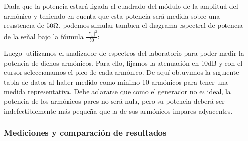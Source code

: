 \documentclass[../../labo_tp5_main.tex]{subfiles}
\begin{document}

Dada que la potencia estará ligada al cuadrado del módulo de la amplitud del armónico y teniendo en cuenta que esta potencia será medida sobre una resistencia de $50\ohm$, podemos simular también el diagrama espectral de potencia de la señal bajo la fórmula $\frac{|X_n|^2}{50}$:\par


Luego, utilizamos el analizador de espectros del laboratorio para poder medir la potencia de dichos armónicos. Para ello, fijamos la atenuación en 10dB y con el cursor seleccionamos el pico de cada armónico. De aquí obtuvimos la siguiente tabla de datos al haber medido como mínimo 10 armónicos para tener una medida representativa. Debe aclararse que como el generador no es ideal, la potencia de los armónicos pares no será nula, pero su potencia deberá ser indefectiblemente más pequeña que la de sus armónicos impares adyacentes.

\subsubsection{Mediciones y comparación de resultados}
\end{document}
